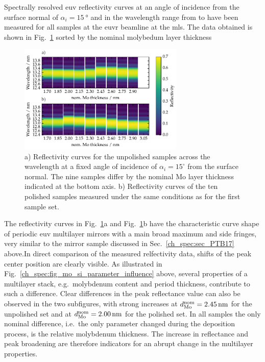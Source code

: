 Spectrally resolved \gls{euv} reflectivity curves at an angle of incidence from the surface normal of $\alpha_i=\SI{15}{\degree}$ and in the wavelength range from  to  have been measured for all samples at the \gls{euvr} beamline at the \gls{mls}. The data obtained is shown in Fig.~\ref{ch_spec:fig_EUV_reflectivity_unpolished_and_polished} sorted by the nominal molybedum layer thickness
\begin{figure}[htbp]
\centering
\includegraphics[width=0.7\textwidth]{img/MoSi_EUV_reflectivity}
\caption{a) Reflectivity curves for the unpolished samples across the wavelength at a fixed angle of incidence of $\alpha_i = 15^\circ$ from the surface normal. The nine samples differ by the nominal Mo layer thickness indicated at the bottom axis. b) Reflectivity curves of the ten polished samples measured under the same conditions as for the first sample set.}
\label{ch_spec:fig_EUV_reflectivity_unpolished_and_polished}
\end{figure}
The reflectivity curves in Fig.~\ref{ch_spec:fig_EUV_reflectivity_unpolished_and_polished}a and Fig.~\ref{ch_spec:fig_EUV_reflectivity_unpolished_and_polished}b have the characteristic curve shape of periodic \gls{euv} multilayer mirrors with a main broad maximum and side fringes, very similar to the mirror sample discussed in Sec.~\ref{ch_spec:sec_PTB17} above.In direct comparison of the measured relfectivity data, shifts of the peak center position are clearly visible. As illustrated in Fig.~\ref{ch_spec:fig_mo_si_parameter_influence} above, several properties of a multilayer stack, e.g.~molybdenum content and period thickness, contribute to such a difference. Clear differences in the peak reflectance value can also be observed in the two subfigures, with strong increases at $d_\text{Mo}^\text{nom} = \nm{2.45}$ for the unpolished set and at $d_\text{Mo}^\text{nom} = \nm{2.00}$ for the polished set. In all samples the only nominal difference, i.e.~the only parameter changed during the deposition process, is the relative molybdenum thickness. The increase in reflectance and peak broadening are therefore indicators for an abrupt change in the multilayer properties.

